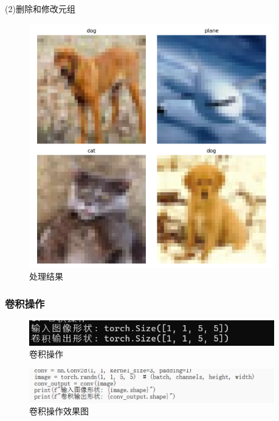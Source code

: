 \documentclass[UTF8]{ctexart}
\begin{document}
(2)删除和修改元组
\begin{figure}[H]
    \centering
    \includegraphics[width=0.95\textwidth]{picture/处理结果.png}%
    \caption{处理结果}
\end{figure}


\subsubsection{卷积操作}

\begin{figure}[H]
    \centering
    \includegraphics[width=0.95\textwidth]{picture/卷积操作.png}%
    \caption{卷积操作}
\end{figure}
\begin{figure}[H]
    \centering
    \includegraphics[width=0.95\textwidth]{picture/卷积操作代码.png}%
    \caption{卷积操作效果图}
\end{figure}
\end{document}
